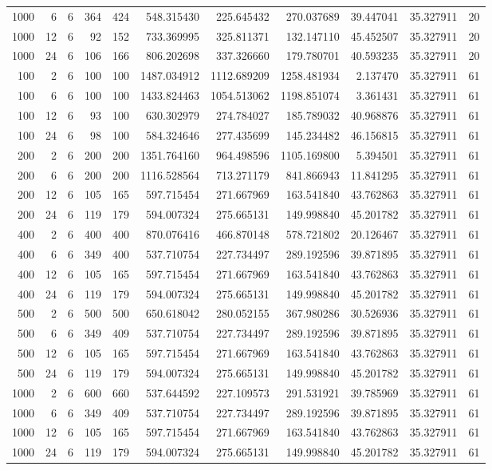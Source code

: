 \begin{table}
\begin{tabular}{rrrrrrrrrrr}
1000 & 6 & 6 & 364 & 424 & 548.315430 & 225.645432 & 270.037689 & 39.447041 & 35.327911 & 20 \\
1000 & 12 & 6 & 92 & 152 & 733.369995 & 325.811371 & 132.147110 & 45.452507 & 35.327911 & 20 \\
1000 & 24 & 6 & 106 & 166 & 806.202698 & 337.326660 & 179.780701 & 40.593235 & 35.327911 & 20 \\
100 & 2 & 6 & 100 & 100 & 1487.034912 & 1112.689209 & 1258.481934 & 2.137470 & 35.327911 & 61 \\
100 & 6 & 6 & 100 & 100 & 1433.824463 & 1054.513062 & 1198.851074 & 3.361431 & 35.327911 & 61 \\
100 & 12 & 6 & 93 & 100 & 630.302979 & 274.784027 & 185.789032 & 40.968876 & 35.327911 & 61 \\
100 & 24 & 6 & 98 & 100 & 584.324646 & 277.435699 & 145.234482 & 46.156815 & 35.327911 & 61 \\
200 & 2 & 6 & 200 & 200 & 1351.764160 & 964.498596 & 1105.169800 & 5.394501 & 35.327911 & 61 \\
200 & 6 & 6 & 200 & 200 & 1116.528564 & 713.271179 & 841.866943 & 11.841295 & 35.327911 & 61 \\
200 & 12 & 6 & 105 & 165 & 597.715454 & 271.667969 & 163.541840 & 43.762863 & 35.327911 & 61 \\
200 & 24 & 6 & 119 & 179 & 594.007324 & 275.665131 & 149.998840 & 45.201782 & 35.327911 & 61 \\
400 & 2 & 6 & 400 & 400 & 870.076416 & 466.870148 & 578.721802 & 20.126467 & 35.327911 & 61 \\
400 & 6 & 6 & 349 & 400 & 537.710754 & 227.734497 & 289.192596 & 39.871895 & 35.327911 & 61 \\
400 & 12 & 6 & 105 & 165 & 597.715454 & 271.667969 & 163.541840 & 43.762863 & 35.327911 & 61 \\
400 & 24 & 6 & 119 & 179 & 594.007324 & 275.665131 & 149.998840 & 45.201782 & 35.327911 & 61 \\
500 & 2 & 6 & 500 & 500 & 650.618042 & 280.052155 & 367.980286 & 30.526936 & 35.327911 & 61 \\
500 & 6 & 6 & 349 & 409 & 537.710754 & 227.734497 & 289.192596 & 39.871895 & 35.327911 & 61 \\
500 & 12 & 6 & 105 & 165 & 597.715454 & 271.667969 & 163.541840 & 43.762863 & 35.327911 & 61 \\
500 & 24 & 6 & 119 & 179 & 594.007324 & 275.665131 & 149.998840 & 45.201782 & 35.327911 & 61 \\
1000 & 2 & 6 & 600 & 660 & 537.644592 & 227.109573 & 291.531921 & 39.785969 & 35.327911 & 61 \\
1000 & 6 & 6 & 349 & 409 & 537.710754 & 227.734497 & 289.192596 & 39.871895 & 35.327911 & 61 \\
1000 & 12 & 6 & 105 & 165 & 597.715454 & 271.667969 & 163.541840 & 43.762863 & 35.327911 & 61 \\
1000 & 24 & 6 & 119 & 179 & 594.007324 & 275.665131 & 149.998840 & 45.201782 & 35.327911 & 61 \\
\bottomrule
\end{tabular}
\end{table}
